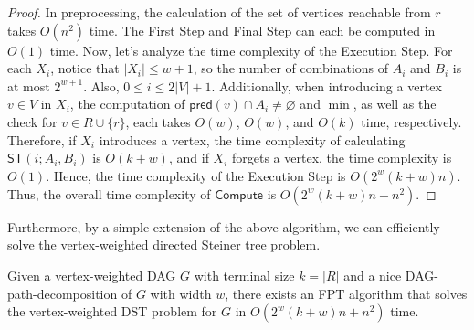 \documentclass[runningheads]{llncs}
\theoremstyle{plain}
\theoremstyle{definition}
\begin{document}
\begin{proof}
    In preprocessing, the calculation of the set of vertices reachable from $r$ takes $O(n^2)$ time. The First Step and Final Step can each be computed in $O(1)$ time. Now, let’s analyze the time complexity of the Execution Step. For each $X_i$, notice that $|X_i| \leq w + 1$, so the number of combinations of $A_i$ and $B_i$ is at most $2^{w+1}$. Also, $0 \leq i \leq 2|V|+1$. Additionally, when introducing a vertex $v \in V$ in $X_i$, the computation of $\mathsf{pred}(v) \cap A_i \neq \varnothing$ and $\min$, as well as the check for $v \in R \cup \{r\}$, each takes $O(w)$, $O(w)$, and $O(k)$ time, respectively. Therefore, if $X_i$ introduces a vertex, the time complexity of calculating $\mathsf{ST}(i; A_i, B_i)$ is $O(k+w)$, and if $X_i$ forgets a vertex, the time complexity is $O(1)$. Hence, the time complexity of the Execution Step is $O(2^w(k+w)n)$. Thus, the overall time complexity of $\mathsf{Compute}$ is $O(2^w(k+w)n + n^2)$.
\end{proof}

Furthermore, by a simple extension of the above algorithm, we can efficiently solve the vertex-weighted directed Steiner tree problem.

\begin{theorem}
    Given a vertex-weighted DAG $G$ with terminal size $k = |R|$ and a nice DAG-path-decomposition of $G$ with width $w$, there exists an FPT algorithm that solves the vertex-weighted DST problem for $G$ in $O(2^w(k+w)n + n^2)$ time.
\end{theorem}
\end{document}
